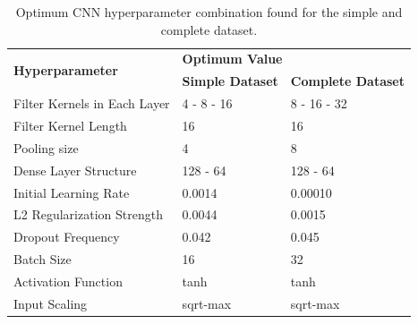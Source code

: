 \begin{table}[H]
\centering
\caption{Optimum CNN hyperparameter combination found for the simple and complete dataset.}
\label{table:hyperparameter_opt_parameters_CNN}
\begin{tabular}{lll}
\hline
\multirow{2}{*}{\textbf{Hyperparameter}} & \multicolumn{2}{l}{\textbf{Optimum Value}} \\
 & \textbf{Simple Dataset} & \textbf{Complete Dataset} \\ \hline
Filter Kernels in Each Layer & 4 - 8 - 16 & 8 - 16 - 32 \\
Filter Kernel Length & 16 & 16 \\
Pooling size & 4 & 8 \\
Dense Layer Structure & 128 - 64 & 128 - 64 \\
Initial Learning Rate & 0.0014 & 0.00010 \\
L2 Regularization Strength & 0.0044 & 0.0015 \\
Dropout Frequency & 0.042 & 0.045 \\
Batch Size & 16 & 32 \\
Activation Function & tanh & tanh \\
Input Scaling & sqrt-max & sqrt-max \\ \hline
\end{tabular}
\end{table}

